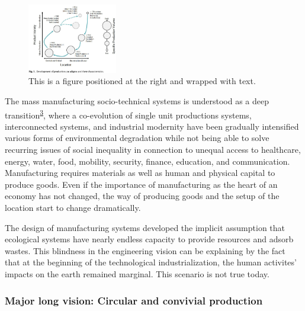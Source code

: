 \documentclass[
  11pt,
  a4paperpaper,
  onecolumn]{article}
\begin{document}
\begin{figure}
\centering
    \includegraphics[width=0.35\textwidth]{Figures/Herrmann2020.png}
    \caption{This is a figure positioned at the right and wrapped with text.}
    \label{fig:img1}
\end{figure}

The mass manufacturing socio-technical systems is understood as a deep
transition\textsuperscript{\protect\hyperlink{ref-kanger2022}{3}}, where
a co-evolution of single unit productions systems, interconnected
systems, and industrial modernity have been gradually intensified
various forms of environmental degradation while not being able to solve
recurring issues of social inequality in connection to unequal access to
healthcare, energy, water, food, mobility, security, finance, education,
and communication. Manufacturing requires materials as well as human and
physical capital to produce goods. Even if the importance of
manufacturing as the heart of an economy has not changed, the way of
producing goods and the setup of the location start to change
dramatically.

The design of manufacturing systems developed the implicit assumption
that ecological systems have nearly endless capacity to provide
resources and adsorb wastes. This blindness in the engineering vision
can be explaining by the fact that at the beginning of the technological
industrialization, the human activites' impacts on the earth remained
marginal. This scenario is not true today.

\hypertarget{major-long-vision-circular-and-convivial-production}{%
\subsubsection{Major long vision: Circular and convivial
production}\label{major-long-vision-circular-and-convivial-production}}
\end{document}
